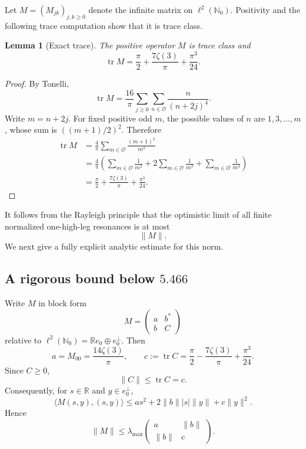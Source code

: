 \documentclass[11pt]{article}
\newtheorem{lemma}[theorem]{Lemma}
\newcommand{\R}{\mathbb R}
\begin{document}
Let $M=(M_{jk})_{j,k\ge0}$ denote the infinite matrix on
$\ell^2(\mathbb N_0)$.  Positivity and the following trace computation show that
it is trace class.

\begin{lemma}[Exact trace]\label{lem:resonance-trace}
The positive operator $M$ is trace class and
\begin{equation}\label{eq:trace-M}
 \boxed{
 \operatorname{tr}M
 =\frac\pi2+\frac{7\zeta(3)}\pi+\frac{\pi^3}{24}.}
\end{equation}
\end{lemma}

\begin{proof}
By Tonelli,
\[
 \operatorname{tr}M
 =\frac{16}{\pi}
 \sum_{j\ge0}\sum_{n\in\mathcal O}
 \frac{n}{(n+2j)^4}.
\]
Write $m=n+2j$.  For fixed positive odd $m$, the possible values of $n$ are
$1,3,\ldots,m$, whose sum is $((m+1)/2)^2$.  Therefore
\[
\begin{aligned}
 \operatorname{tr}M
 &=\frac4\pi\sum_{m\in\mathcal O}
 \frac{(m+1)^2}{m^4}\\
 &=\frac4\pi\left(
 \sum_{m\in\mathcal O}\frac1{m^2}
 +2\sum_{m\in\mathcal O}\frac1{m^3}
 +\sum_{m\in\mathcal O}\frac1{m^4}
 \right)\\
 &=\frac\pi2+\frac{7\zeta(3)}\pi+\frac{\pi^3}{24}.
\end{aligned}
\]
\end{proof}

It follows from the Rayleigh principle that the optimistic limit of all finite
normalized one-high-leg resonances is at most
\[
        \|M\|.
\]
We next give a fully explicit analytic estimate for this norm.

\subsection{A rigorous bound below \texorpdfstring{$5.466$}{5.466}}

Write $M$ in block form
\[
        M=
        \begin{pmatrix}
        a&b^*\\ b&C
        \end{pmatrix}
\]
relative to $\ell^2(\mathbb N_0)=\R e_0\oplus e_0^\perp$.  Then
\begin{equation}\label{eq:a-c-values}
 a=M_{00}=\frac{14\zeta(3)}\pi,
 \qquad
 c:=\operatorname{tr}C
 =\frac\pi2-\frac{7\zeta(3)}\pi+\frac{\pi^3}{24}.
\end{equation}
Since $C\ge0$,
\[
        \|C\|\le\operatorname{tr}C=c.
\]
Consequently, for $s\in\R$ and $y\in e_0^\perp$,
\[
 \langle M(s,y),(s,y)\rangle
 \le
 a s^2+2\|b\||s|\|y\|+c\|y\|^2.
\]
Hence
\begin{equation}\label{eq:block-upper}
 \|M\|
 \le
 \lambda_{\max}
 \begin{pmatrix}
 a&\|b\|\\ \|b\|&c
 \end{pmatrix}.
\end{equation}
\end{document}
